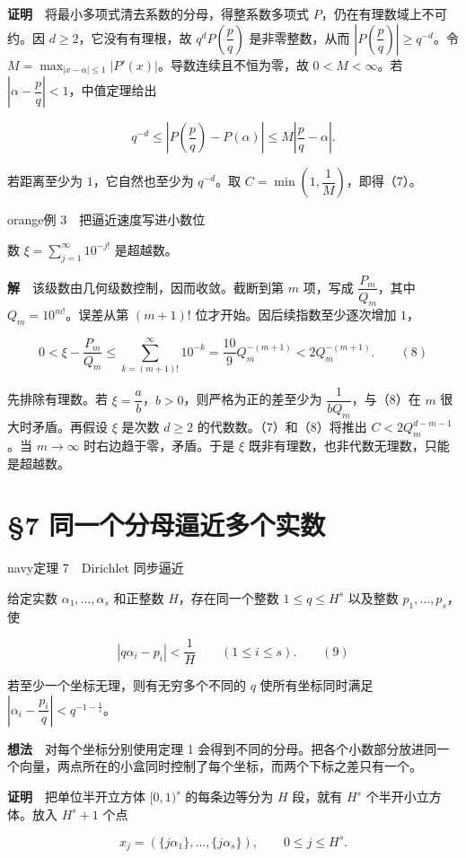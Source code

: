\documentclass[11pt,a4paper]{article}
\newcommand{\articleheading}[1]{\section{#1}}
\begin{document}
\textbf{证明}　将最小多项式清去系数的分母，得整系数多项式 $P$，仍在有理数域上不可约。因 $d\ge2$，它没有有理根，故 $q^dP(\dfrac pq)$ 是非零整数，从而 $|P(\dfrac pq)|\ge q^{-d}$。令 $M=\max_{|x-\alpha|\le1}|P'(x)|$。导数连续且不恒为零，故 $0<M<\infty$。若 $|\alpha-\dfrac pq|<1$，中值定理给出

\[
q^{-d}\le |P(\dfrac pq)-P(\alpha)|\le M\left|\dfrac pq-\alpha\right|.
\]

若距离至少为 $1$，它自然也至少为 $q^{-d}$。取 $C=\min(1,\dfrac1M)$，即得（7）。

\begin{sboxenv}{orange}{例 3　把逼近速度写进小数位}

数 $\xi=\sum_{j=1}^{\infty}10^{-j!}$ 是超越数。
\end{sboxenv}

\textbf{解}　该级数由几何级数控制，因而收敛。截断到第 $m$ 项，写成 $\dfrac{P_m}{Q_m}$，其中 $Q_m=10^{m!}$。误差从第 $(m+1)!$ 位才开始。因后续指数至少逐次增加 $1$，

\[
0<\xi-\frac{P_m}{Q_m}
\le\sum_{k=(m+1)!}^{\infty}10^{-k}
=\frac{10}{9}Q_m^{-(m+1)}
<2Q_m^{-(m+1)}.\qquad\mathrm{(8)}
\]

先排除有理数。若 $\xi=\dfrac ab$，$b>0$，则严格为正的差至少为 $\dfrac1{bQ_m}$，与（8）在 $m$ 很大时矛盾。再假设 $\xi$ 是次数 $d\ge2$ 的代数数。（7）和（8）将推出 $C<2Q_m^{d-m-1}$。当 $m\to\infty$ 时右边趋于零，矛盾。于是 $\xi$ 既非有理数，也非代数无理数，只能是超越数。

\clearpage\articleheading{§7 同一个分母逼近多个实数}

\begin{sboxenv}{navy}{定理 7　Dirichlet 同步逼近}

给定实数 $\alpha_1,\ldots,\alpha_s$ 和正整数 $H$，存在同一个整数 $1\le q\le H^s$ 以及整数 $p_1,\ldots,p_s$，使

\[
|q\alpha_i-p_i|<\frac1H\qquad(1\le i\le s).\qquad\mathrm{(9)}
\]

若至少一个坐标无理，则有无穷多个不同的 $q$ 使所有坐标同时满足 $|\alpha_i-\dfrac{p_i}{q}|<q^{-1-\frac1s}$。
\end{sboxenv}

\textbf{想法}　对每个坐标分别使用定理 1 会得到不同的分母。把各个小数部分放进同一个向量，两点所在的小盒同时控制了每个坐标，而两个下标之差只有一个。

\textbf{证明}　把单位半开立方体 $[0,1)^s$ 的每条边等分为 $H$ 段，就有 $H^s$ 个半开小立方体。放入 $H^s+1$ 个点

\[
x_j=(\{j\alpha_1\},\ldots,\{j\alpha_s\}),\qquad 0\le j\le H^s .
\]
\end{document}
